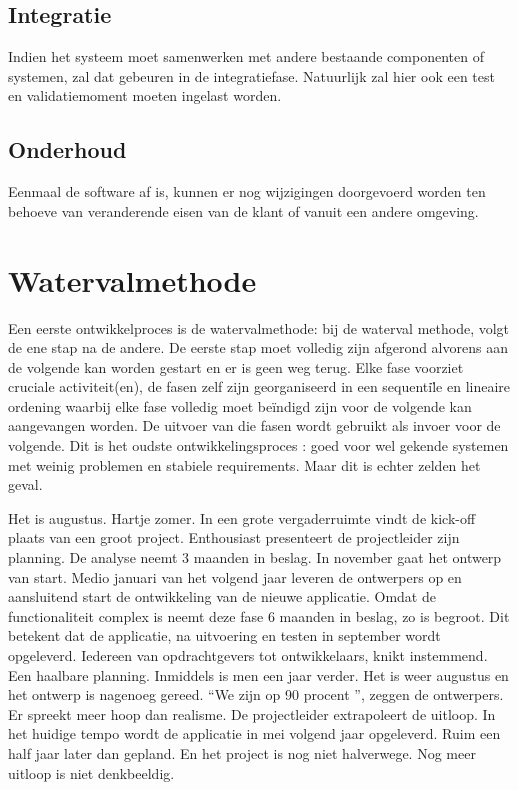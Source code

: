 \subsection{Integratie}
Indien het systeem moet samenwerken met andere bestaande componenten of systemen, zal dat gebeuren in de integratiefase. Natuurlijk zal hier ook een test en validatiemoment moeten ingelast worden.

\subsection{Onderhoud}
Eenmaal de software af is, kunnen er nog wijzigingen doorgevoerd worden ten behoeve van veranderende eisen van de klant of vanuit een andere omgeving. 

\section{Watervalmethode}
Een eerste ontwikkelproces is de watervalmethode: bij de waterval methode, volgt de ene stap na de andere. De eerste stap moet volledig zijn afgerond alvorens aan de volgende kan worden gestart en er is geen weg terug. Elke fase voorziet cruciale activiteit(en), de fasen zelf zijn georganiseerd in een sequenti\"le en lineaire ordening waarbij elke fase volledig moet be\"indigd zijn voor de volgende kan aangevangen worden. De uitvoer van die fasen wordt gebruikt als invoer voor de volgende. Dit is het oudste ontwikkelingsproces : goed voor wel gekende systemen met weinig problemen en stabiele requirements. Maar dit is echter zelden het geval.

\begin{example}
	Het is augustus. Hartje zomer. In een grote vergaderruimte vindt de kick-off plaats van een groot project. Enthousiast presenteert de projectleider zijn planning. De analyse neemt 3 maanden in beslag. In november gaat het ontwerp van start. Medio januari van het volgend jaar leveren de ontwerpers op en aansluitend start de ontwikkeling van de nieuwe applicatie. Omdat de functionaliteit complex is neemt deze fase 6 maanden in beslag, zo is begroot. Dit betekent dat de applicatie, na uitvoering en testen in september wordt opgeleverd. Iedereen van opdrachtgevers tot ontwikkelaars, knikt instemmend. Een haalbare planning.
Inmiddels is men een jaar verder. Het is weer augustus en het ontwerp is nagenoeg gereed. ``We zijn op 90 procent '', zeggen de ontwerpers. Er spreekt meer hoop dan realisme. De projectleider extrapoleert de uitloop. In het huidige tempo wordt de applicatie in mei volgend jaar opgeleverd. Ruim een half jaar later dan gepland. En het project is nog niet halverwege. Nog meer uitloop is niet denkbeeldig.
\end{example}

